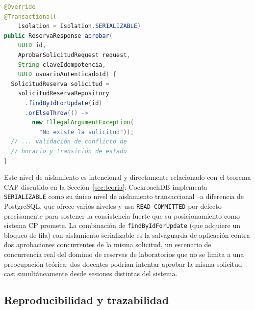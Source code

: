 \documentclass[10pt,twocolumn]{article}
\begin{document}
\begin{lstlisting}[language=Java,caption={Transacción serializable en la aprobación de una solicitud (\texttt{SolicitudReservaServiceImpl.java}).},label={lst:isolation}]
@Override
@Transactional(
    isolation = Isolation.SERIALIZABLE)
public ReservaResponse aprobar(
    UUID id,
    AprobarSolicitudRequest request,
    String claveIdempotencia,
    UUID usuarioAutenticadoId) {
  SolicitudReserva solicitud =
    solicitudReservaRepository
      .findByIdForUpdate(id)
      .orElseThrow(() ->
        new IllegalArgumentException(
          "No existe la solicitud"));
  // ... validación de conflicto de
  // horario y transición de estado
}
\end{lstlisting}

Este nivel de aislamiento es intencional y directamente relacionado con el
teorema CAP discutido en la Sección~\ref{sec:teoria}: CockroachDB
implementa \texttt{SERIALIZABLE} como su único nivel de aislamiento
transaccional --a diferencia de PostgreSQL, que ofrece varios niveles y usa
\texttt{READ COMMITTED} por defecto-- precisamente para sostener la
consistencia fuerte que su posicionamiento como sistema CP promete. La
combinación de \texttt{findByIdForUpdate} (que adquiere un bloqueo de fila)
con aislamiento serializable es la salvaguarda de aplicación contra dos
aprobaciones concurrentes de la misma solicitud, un escenario de
concurrencia real del dominio de reservas de laboratorios que no se limita
a una preocupación teórica: dos docentes podrían intentar aprobar la misma
solicitud casi simultáneamente desde sesiones distintas del sistema.

\subsection{Reproducibilidad y trazabilidad}
\end{document}
